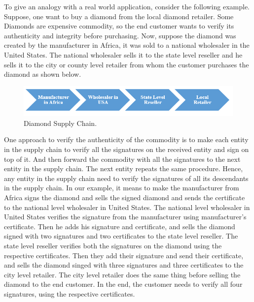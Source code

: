 	To give an analogy with a real world application, consider the following example.
	Suppose, one want to buy a diamond from the local diamond retailer.
	Some Diamonds are expensive commodity, so the end customer wants to verify its authenticity and integrity before purchasing.
	Now, suppose the diamond was created by the manufacturer in Africa, it was sold to a national wholesaler in the United States. 
	The national wholesaler sells it to the state level reseller and he sells it to the city or county level retailer from whom the customer purchases the diamond as shown below.
	\begin{figure}[h!]
        \centering
        \includegraphics[scale = 0.5]{images/diamond-supply-chain.png}
        \caption{Diamond Supply Chain.}
        \label{fig:diamond-supply-chain}
    \end{figure}

	One approach to verify the authenticity of the commodity is to make each entity in the supply chain to verify all the signatures on the received entity and sign on top of it.
	And then forward the commodity with all the signatures to the next entity in the supply chain.
	The next entity repeats the same procedure.
	Hence, any entity in the supply chain need to verify the signatures of all its descendants in the supply chain.
	In our example, it means to make the manufacturer from Africa signs the diamond and sells the signed diamond and sends the certificate to the national level wholesaler in United States.
	The national level wholesaler in United States verifies the signature from the manufacturer using manufacturer's certificate.
	Then he adds his signature and certificate, and sells the diamond signed with two signatures and two certificates to the state level reseller.
	The state level reseller verifies both the signatures on the diamond using the respective certificates.
	Then they add their signature and send their certificate, and sells the diamond singed with three signatures and three certificates to the city level retailer. 
	The city level retailer does the same thing before selling the diamond to the end customer.
	In the end, the customer needs to verify all four signatures, using the respective certificates.


